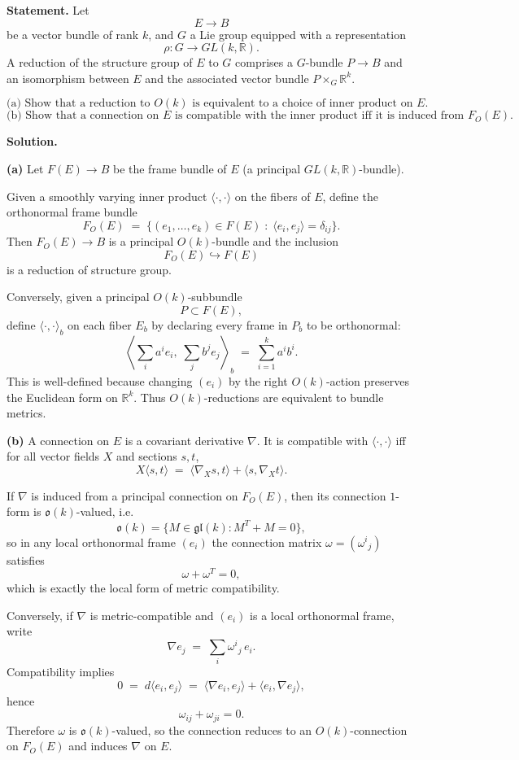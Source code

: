 \documentclass[12pt,a4paper]{article}
\theoremstyle{plain}
\theoremstyle{definition}      %
\begin{document}
\textbf{Statement.}
Let
\[
E\longrightarrow B
\]
be a vector bundle of rank $k$, and $G$ a Lie group equipped with a representation
\[
\rho:G\longrightarrow GL(k,\mathbb{R}).
\]
A reduction of the structure group of $E$ to $G$ comprises a $G$-bundle $P\to B$ and an isomorphism between $E$ and the associated vector bundle $P\times_G\mathbb{R}^k$.

\[
\text{(a) Show that a reduction to } O(k) \text{ is equivalent to a choice of inner product on } E.
\]
\[
\text{(b) Show that a connection on } E \text{ is compatible with the inner product iff it is induced from } F_O(E).
\]

\textbf{Solution.}

\textbf{(a)}
Let $F(E)\to B$ be the frame bundle of $E$ (a principal $GL(k,\mathbb{R})$-bundle).

Given a smoothly varying inner product $\langle\cdot,\cdot\rangle$ on the fibers of $E$, define the orthonormal frame bundle
\[
F_O(E)
\;=\;
\{(e_1,\dots,e_k)\in F(E)\;:\;\langle e_i,e_j\rangle=\delta_{ij}\}.
\]
Then $F_O(E)\to B$ is a principal $O(k)$-bundle and the inclusion
\[
F_O(E)\hookrightarrow F(E)
\]
is a reduction of structure group.

Conversely, given a principal $O(k)$-subbundle
\[
P\subset F(E),
\]
define $\langle\cdot,\cdot\rangle_b$ on each fiber $E_b$ by declaring every frame in $P_b$ to be orthonormal:
\[
\left\langle \sum_i a^i e_i,\;\sum_j b^j e_j\right\rangle_b
\;=\;
\sum_{i=1}^k a^i b^i.
\]
This is well-defined because changing $(e_i)$ by the right $O(k)$-action preserves the Euclidean form on $\mathbb{R}^k$.
Thus $O(k)$-reductions are equivalent to bundle metrics.

\textbf{(b)}
A connection on $E$ is a covariant derivative $\nabla$.
It is compatible with $\langle\cdot,\cdot\rangle$ iff for all vector fields $X$ and sections $s,t$,
\[
X\langle s,t\rangle
\;=\;
\langle \nabla_X s,t\rangle+\langle s,\nabla_X t\rangle.
\]

If $\nabla$ is induced from a principal connection on $F_O(E)$, then its connection $1$-form is $\mathfrak{o}(k)$-valued, i.e.
\[
\mathfrak{o}(k)=\{M\in \mathfrak{gl}(k): M^T+M=0\},
\]
so in any local orthonormal frame $(e_i)$ the connection matrix $\omega=(\omega^i{}_j)$ satisfies
\[
\omega+\omega^T=0,
\]
which is exactly the local form of metric compatibility.

Conversely, if $\nabla$ is metric-compatible and $(e_i)$ is a local orthonormal frame, write
\[
\nabla e_j \;=\; \sum_i \omega^i{}_j\,e_i.
\]
Compatibility implies
\[
0 \;=\; d\langle e_i,e_j\rangle
\;=\;
\langle \nabla e_i,e_j\rangle+\langle e_i,\nabla e_j\rangle,
\]
hence
\[
\omega_{ij}+\omega_{ji}=0.
\]
Therefore $\omega$ is $\mathfrak{o}(k)$-valued, so the connection reduces to an $O(k)$-connection on $F_O(E)$ and induces $\nabla$ on $E$.
\end{document}
